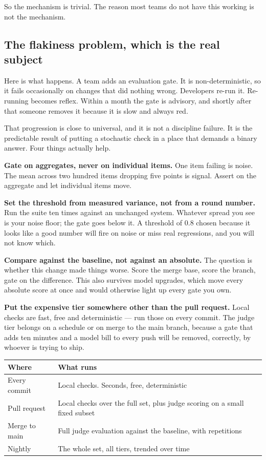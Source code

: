 So the mechanism is trivial. The reason most teams do not have this working is
not the mechanism.

\subsection{The flakiness problem, which is the real subject}

Here is what happens. A team adds an evaluation gate. It is non-deterministic, so
it fails occasionally on changes that did nothing wrong. Developers re-run it.
Re-running becomes reflex. Within a month the gate is advisory, and shortly after
that someone removes it because it is slow and always red.

That progression is close to universal, and it is not a discipline failure. It is
the predictable result of putting a stochastic check in a place that demands a
binary answer. Four things actually help.

\textbf{Gate on aggregates, never on individual items.} One item failing is
noise. The mean across two hundred items dropping five points is signal. Assert
on the aggregate and let individual items move.

\textbf{Set the threshold from measured variance, not from a round number.} Run
the suite ten times against an unchanged system. Whatever spread you see is your
noise floor; the gate goes below it. A threshold of 0.8 chosen because it looks
like a good number will fire on noise or miss real regressions, and you will not
know which.

\textbf{Compare against the baseline, not against an absolute.} The question is
whether this change made things worse. Score the merge base, score the branch,
gate on the difference. This also survives model upgrades, which move every
absolute score at once and would otherwise light up every gate you own.

\textbf{Put the expensive tier somewhere other than the pull request.} Local
checks are fast, free and deterministic --- run those on every commit. The judge
tier belongs on a schedule or on merge to the main branch, because a gate that
adds ten minutes and a model bill to every push will be removed, correctly, by
whoever is trying to ship.

\begin{center}
\small
\begin{tabularx}{\linewidth}{@{}lX@{}}
\toprule
\textbf{Where} & \textbf{What runs} \\
\midrule
Every commit & Local checks. Seconds, free, deterministic \\[4pt]
Pull request & Local checks over the full set, plus judge scoring on a small
fixed subset \\[4pt]
Merge to main & Full judge evaluation against the baseline, with repetitions \\[4pt]
Nightly & The whole set, all tiers, trended over time \\
\bottomrule
\end{tabularx}
\end{center}

